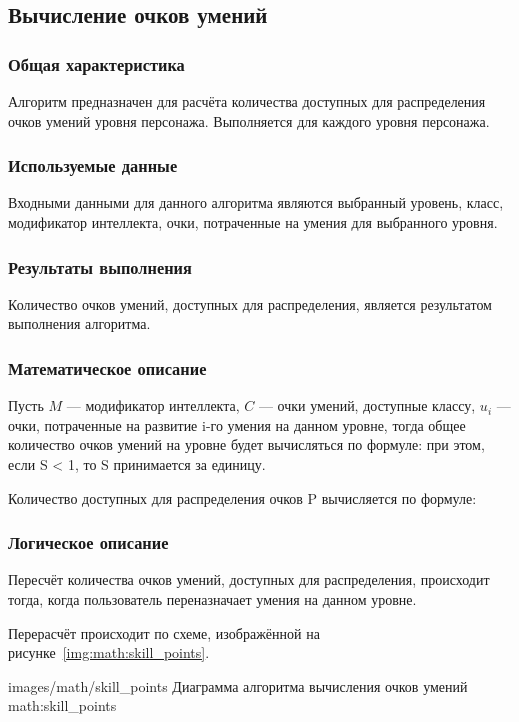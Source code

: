 \subsection{Вычисление очков умений}

\subsubsection{Общая характеристика}

Алгоритм предназначен для расчёта количества доступных для распределения очков умений уровня персонажа. Выполняется для каждого уровня персонажа.

\subsubsection{Используемые данные}

Входными данными для данного алгоритма являются выбранный уровень, класс, модификатор интеллекта, очки, потраченные на умения для выбранного уровня.

\subsubsection{Результаты выполнения}

Количество очков умений, доступных для распределения, является результатом выполнения алгоритма.

\subsubsection{Математическое описание}

Пусть $M$ --- модификатор интеллекта, $C$ --- очки умений, доступные классу, $u_i$ --- очки, потраченные на развитие i-го умения на данном уровне, тогда общее количество очков умений на уровне будет вычисляться по формуле:
при этом, если S < 1, то S принимается за единицу.

Количество доступных для распределения очков P вычисляется по формуле:

\subsubsection{Логическое описание}

Пересчёт количества очков умений, доступных для распределения, происходит тогда, когда пользователь переназначает умения на данном уровне.

Перерасчёт происходит по схеме, изображённой на рисунке~\ref{img:math:skill_points}.

            {images/math/skill_points}
            {Диаграмма алгоритма вычисления очков умений}
            {math:skill_points}
